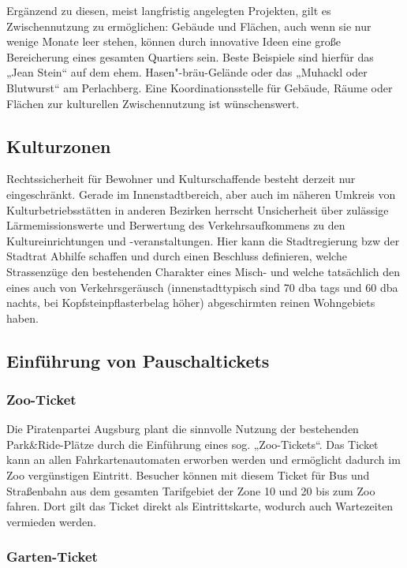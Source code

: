   Ergänzend zu diesen, meist langfristig angelegten Projekten, gilt es 
  Zwischennutzung zu ermöglichen: Gebäude und Flächen, auch wenn sie nur 
  wenige Monate leer stehen, können durch innovative Ideen eine große 
  Bereicherung eines gesamten Quartiers sein. Beste Beispiele sind hierfür 
  das „Jean Stein“ auf dem ehem. Hasen"-bräu-Gelände oder das „Muhackl oder 
  Blutwurst“ am Perlachberg. Eine Koordinationsstelle für Gebäude, Räume oder 
  Flächen zur kulturellen Zwischennutzung ist wünschenswert.
  
  \subsection{Kulturzonen}
  
  Rechtssicherheit für Bewohner und Kulturschaffende besteht derzeit nur 
  eingeschränkt. Gerade im Innenstadtbereich, aber auch im näheren Umkreis 
  von Kulturbetriebsstätten in anderen Bezirken herrscht Unsicherheit über 
  zulässige Lärmemissionswerte und Berwertung des Verkehrsaufkommens zu den 
  Kultureinrichtungen und -veranstaltungen. Hier kann die Stadtregierung bzw 
  der Stadtrat Abhilfe schaffen und durch einen Beschluss definieren, welche 
  Strassenzüge den bestehenden Charakter eines Misch- und welche tatsächlich 
  den eines auch von Verkehrsgeräusch (innenstadttypisch sind 70 dba tags und 
  60 dba nachts, bei Kopfsteinpflasterbelag höher) abgeschirmten reinen 
  Wohngebiets haben.
  
  \subsection{Einführung von Pauschaltickets}
  
  \subsubsection{Zoo-Ticket}
  
  Die Piratenpartei Augsburg plant die sinnvolle Nutzung der bestehenden 
  Park\&Ride-Plätze durch die Einführung eines sog. „Zoo-Tickets“. Das 
  Ticket 
  kann an allen Fahrkartenautomaten erworben werden und ermöglicht dadurch im 
  Zoo vergünstigen Eintritt. Besucher können mit diesem Ticket für Bus und 
  Straßenbahn aus dem gesamten Tarifgebiet der Zone 10 und 20 bis zum Zoo 
  fahren. Dort gilt das Ticket direkt als Eintrittskarte, wodurch auch 
  Wartezeiten vermieden werden.
  
  \subsubsection{Garten-Ticket}
  
